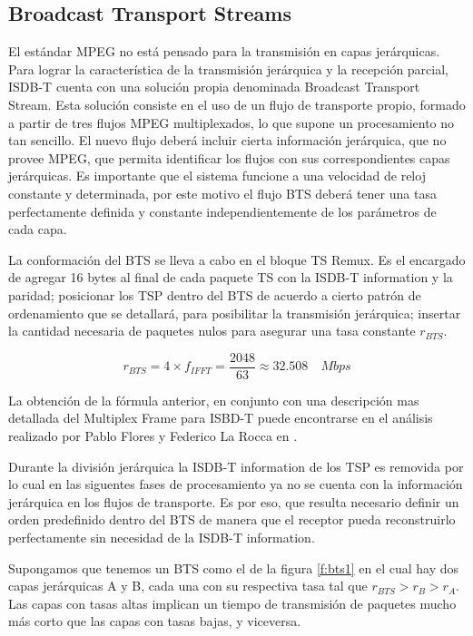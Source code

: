 \subsection{Broadcast Transport Streams}

El estándar MPEG no está pensado para la transmisión en capas jerárquicas. Para lograr la característica de la transmisión jerárquica y la recepción parcial, ISDB-T cuenta con una solución propia denominada Broadcast Transport Stream. Esta solución consiste en el uso
de un flujo de transporte propio, formado a partir de tres flujos MPEG multiplexados, lo que supone un procesamiento no tan sencillo. El nuevo flujo deberá incluir cierta información jerárquica, que no provee MPEG, que permita identificar los flujos con sus correspondientes capas jerárquicas. Es importante que el sistema funcione a una velocidad de reloj constante y determinada, por este motivo el flujo BTS deberá tener una tasa perfectamente definida y constante independientemente de los parámetros de cada capa.

La conformación del \gls{BTS} se lleva a cabo en el bloque TS Remux. Es el encargado de agregar 16 bytes al final de cada paquete TS con la ISDB-T information y la paridad; posicionar los TSP dentro del BTS de acuerdo a cierto patrón de ordenamiento que se detallará, para posibilitar la transmisión jerárquica; insertar la cantidad necesaria de paquetes nulos para asegurar una tasa constante $r_{BTS}$. 

\begin{equation*}
	r_{BTS} = 4 \times f_{IFFT} = \frac{2048}{63} \approx 32.508 \quad Mbps
\end{equation*}

La obtención de la fórmula anterior, en conjunto con una descripción mas detallada del Multiplex Frame para ISBD-T puede encontrarse en el análisis realizado por Pablo Flores y Federico La Rocca en \cite{gr-isdbt}.

Durante la división jerárquica la ISDB-T information de los TSP es removida por lo cual en las siguentes fases de procesamiento ya no se cuenta con la información jerárquica en los flujos de transporte. Es por eso, que resulta necesario definir un orden predefinido dentro del BTS de manera que el receptor pueda reconstruirlo perfectamente sin necesidad de la ISDB-T information. 

Supongamos que tenemos un BTS como el de la figura \ref{f:bts1} en el cual hay dos capas jerárquicas A y B, cada una con su respectiva tasa tal que $r_{BTS}> r_B > r_A$. Las capas con tasas altas implican un tiempo de transmisión de paquetes mucho más corto que las capas con tasas bajas, y viceversa.

